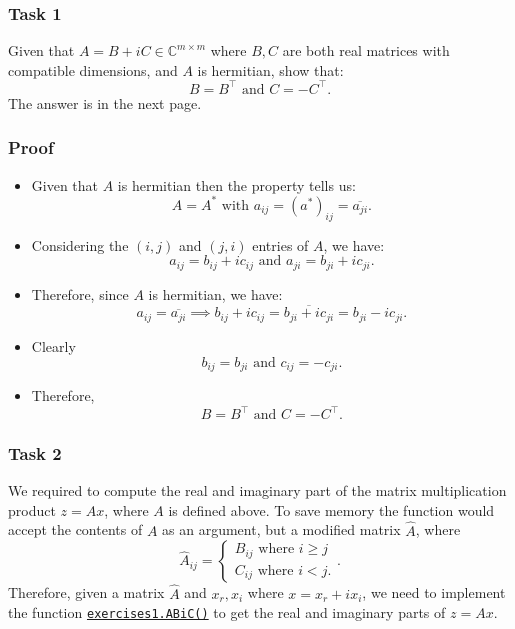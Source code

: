 \subsubsection*{Task 1}%

\noindent Given that $A = B + iC \in \mathbb{C}^{m \times m}$ where $B, C$ are both real matrices with compatible dimensions, and  $A$ is hermitian, show that:
\[
  B = B^{\top} \text{ and } C = -C^{\top}
.\]
The answer is in the next page.
\newpage
\subsubsection*{Proof}
\begin{itemize}
  \item Given that $A$ is hermitian then the property tells us:
    \[
      A = A^{* } \text{ with } a_{ij} = (a^{*})_{ij} = \overline{a_{ji}}
    .\]
  \item Considering the $ (i, j)$ and $(j, i)$ entries of $A$, we have:
    \[
    a_{ij} = b_{ij} + ic_{ij} \text{ and } a_{ji} = b_{ji} + ic_{ji}
    .\] 
  \item Therefore, since $A$ is hermitian, we have:
    \[
    a_{ij} = \overline{a_{ji}} \implies b_{ij} + ic_{ij} = \overline{b_{ji} + ic_{ji}} = b_{ji} - ic_{ji}
    .\] 
  \item Clearly
    \[
    b_{ij} = b_{ji} \text{ and } c_{ij} = -c_{ji}
    .\]
  \item Therefore,
    \[
    B = B^{\top} \text{ and } C = -C^{\top}
    .\] 
\end{itemize}
\subsubsection*{Task 2}%
We required to compute the real and imaginary part of the matrix multiplication product $z = Ax$, where  $A$ is defined above. To save memory the function would accept the contents of $A$ as an argument, but a modified matrix $\hat{A}$, where
\[
\hat{A}_{ij} = \left\{
  \begin{array}{l}
  B_{ij} \text{ where } i \ge j \\
  C_{ij} \text{ where } i < j.
  \end{array}
\right.
.\] 
Therefore, given a matrix $\hat{A}$ and $x_r, x_i$ where  $x = x_r + ix_i$, we need to implement the function \href{https://comp-lin-alg.github.io/cla_utils.html#cla_utils.exercises1.ABiC}{\texttt{exercises1.ABiC()}} to get the real and imaginary parts of \(z = Ax\). \medskip

